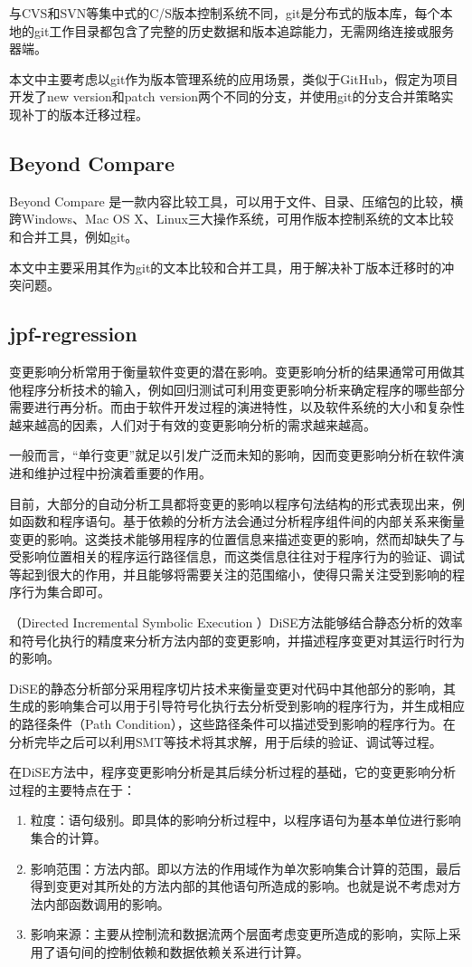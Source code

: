 与CVS和SVN等集中式的C/S版本控制系统不同，git是分布式的版本库，每个本地的git工作目录都包含了完整的历史数据和版本追踪能力，无需网络连接或服务器端。
      

本文中主要考虑以git作为版本管理系统的应用场景，类似于GitHub，假定为项目开发了new version和patch version两个不同的分支，并使用git的分支合并策略实现补丁的版本迁移过程。
	\subsection{Beyond Compare}
		
Beyond Compare 是一款内容比较工具，可以用于文件、目录、压缩包的比较，横跨Windows、Mac OS X、Linux三大操作系统，可用作版本控制系统的文本比较和合并工具，例如git。
      
本文中主要采用其作为git的文本比较和合并工具，用于解决补丁版本迁移时的冲突问题。


	\subsection{jpf-regression} 
变更影响分析常用于衡量软件变更的潜在影响。变更影响分析的结果通常可用做其他程序分析技术的输入，例如回归测试可利用变更影响分析来确定程序的哪些部分需要进行再分析。而由于软件开发过程的演进特性，以及软件系统的大小和复杂性越来越高的因素，人们对于有效的变更影响分析的需求越来越高。\cite{rungta2012change}

一般而言，“单行变更”就足以引发广泛而未知的影响，因而变更影响分析在软件演进和维护过程中扮演着重要的作用。

目前，大部分的自动分析工具都将变更的影响以程序句法结构的形式表现出来，例如函数和程序语句。基于依赖的分析方法会通过分析程序组件间的内部关系来衡量变更的影响。这类技术能够用程序的位置信息来描述变更的影响，然而却缺失了与受影响位置相关的程序运行路径信息，而这类信息往往对于程序行为的验证、调试等起到很大的作用，并且能够将需要关注的范围缩小，使得只需关注受到影响的程序行为集合即可。

（Directed Incremental Symbolic Execution ）DiSE\cite{person2011directed,yang2014directed}方法能够结合静态分析的效率和符号化执行的精度来分析方法内部的变更影响，并描述程序变更对其运行时行为的影响。

DiSE的静态分析部分采用程序切片技术来衡量变更对代码中其他部分的影响，其生成的影响集合可以用于引导符号化执行去分析受到影响的程序行为，并生成相应的路径条件（Path Condition），这些路径条件可以描述受到影响的程序行为。在分析完毕之后可以利用SMT等技术将其求解，用于后续的验证、调试等过程。

在DiSE方法中，程序变更影响分析是其后续分析过程的基础，它的变更影响分析过程的主要特点在于：
\begin{enumerate}
	\item 粒度：语句级别。即具体的影响分析过程中，以程序语句为基本单位进行影响集合的计算。
	\item 影响范围：方法内部。即以方法的作用域作为单次影响集合计算的范围，最后得到变更对其所处的方法内部的其他语句所造成的影响。也就是说不考虑对方法内部函数调用的影响。
	\item 影响来源：主要从控制流和数据流两个层面考虑变更所造成的影响，实际上采用了语句间的控制依赖和数据依赖关系进行计算。
\end{enumerate}

